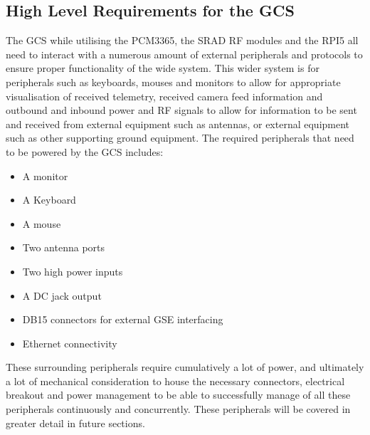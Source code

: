 \subsection{High Level Requirements for the GCS}
The GCS while utilising the PCM3365, the SRAD RF modules and the RPI5 all need to interact with a numerous amount of external peripherals and protocols to ensure proper functionality of the wide system. This wider system is for peripherals such as keyboards, mouses and monitors to allow for appropriate visualisation of received telemetry, received camera feed information and outbound and inbound power and RF signals to allow for information to be sent and received from external equipment such as antennas, or external equipment such as other supporting ground equipment. The required peripherals that need to be powered by the GCS includes: 
\begin{itemize}
    \item A monitor 
    \item A Keyboard
    \item A mouse
    \item Two antenna ports
    \item Two high power inputs
    \item A DC jack output
    \item DB15 connectors for external GSE interfacing
    \item Ethernet connectivity
\end{itemize}
These surrounding peripherals require cumulatively a lot of power, and ultimately a lot of mechanical consideration to house  the necessary connectors, electrical breakout and power management to be able to successfully manage of all these peripherals continuously and concurrently. These peripherals will be covered in greater detail in future sections. 
